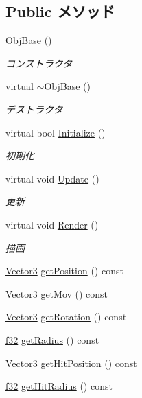 \subsection*{Public メソッド}
\begin{DoxyCompactItemize}
\item 
\hyperlink{class_obj_base_ab7a2f2e63f2ef5c735faad622399d4dc}{Obj\-Base} ()
\begin{DoxyCompactList}\small\item\em コンストラクタ \end{DoxyCompactList}\item 
virtual \hyperlink{class_obj_base_a54ccb5455d3deacd3d342b09f7965bbc}{$\sim$\-Obj\-Base} ()
\begin{DoxyCompactList}\small\item\em デストラクタ \end{DoxyCompactList}\item 
virtual bool \hyperlink{class_obj_base_a278846a0c6381ecefdfb0798472b7b8c}{Initialize} ()
\begin{DoxyCompactList}\small\item\em 初期化 \end{DoxyCompactList}\item 
virtual void \hyperlink{class_obj_base_a83992aba2dcaf6d3548dd17618b4b0b9}{Update} ()
\begin{DoxyCompactList}\small\item\em 更新 \end{DoxyCompactList}\item 
virtual void \hyperlink{class_obj_base_aecde185a045789498626dbfc104950ef}{Render} ()
\begin{DoxyCompactList}\small\item\em 描画 \end{DoxyCompactList}\item 
\hyperlink{struct_vector3}{Vector3} \hyperlink{class_obj_base_aaf39427e88188735373b4ac1cc0f30b3}{get\-Position} () const 
\item 
\hyperlink{struct_vector3}{Vector3} \hyperlink{class_obj_base_a14f5da5ba7748f44aec4e398a143c8cd}{get\-Mov} () const 
\item 
\hyperlink{struct_vector3}{Vector3} \hyperlink{class_obj_base_ad24f6c206c4b736eae5476b50f23f377}{get\-Rotation} () const 
\item 
\hyperlink{_main_8h_a5f6906312a689f27d70e9d086649d3fd}{f32} \hyperlink{class_obj_base_ae92b3cfdad5e400686aab1c24c916921}{get\-Radius} () const 
\item 
\hyperlink{struct_vector3}{Vector3} \hyperlink{class_obj_base_aadebcb51462e8afc1313a70d1b9e7876}{get\-Hit\-Position} () const 
\item 
\hyperlink{_main_8h_a5f6906312a689f27d70e9d086649d3fd}{f32} \hyperlink{class_obj_base_ae804330778801e616d570a556c2d80ed}{get\-Hit\-Radius} () const 
\end{DoxyCompactItemize}
